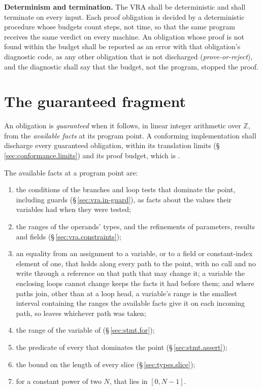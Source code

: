 \begin{constraint}
  \textbf{Determinism and termination.}
  The VRA shall be deterministic and shall terminate on every input.  Each proof
  obligation is decided by a deterministic procedure whose budgets count steps,
  not time, so that the same program receives the same verdict on every
  machine.  An obligation whose proof is not found within the budget shall be
  reported as an error with that obligation's diagnostic code, as any other
  obligation that is not discharged (\emph{prove-or-reject}), and the diagnostic
  shall say that the budget, not the program, stopped the proof.
\end{constraint}

\section{The guaranteed fragment}
\label{sec:vra.fragment}

\pnum
An obligation is \emph{guaranteed} when it follows, in linear integer arithmetic
over $\mathbb{Z}$, from the \emph{available facts} at its program point.  A
conforming implementation shall discharge every guaranteed obligation, within
its translation limits (\S\,\ref{sec:conformance.limits}) and its proof budget,
which is .

\pnum
The available facts at a program point are:
\begin{enumerate}
  \item the conditions of the branches and loop tests that dominate the point,
        including  guards (\S\,\ref{sec:vra.in-guard}), as facts about
        the values their variables had when they were tested;
  \item the ranges of the operands' types, and the refinements of parameters,
        results and fields (\S\,\ref{sec:vra.constraints});
  \item an equality from an assignment to a variable, or to a field or
        constant-index element of one, that holds along every path to the
        point, with no call and no write through a reference on that path
        that may change it; a variable the enclosing loops cannot change keeps
        the facts it had before them; and where paths join, other than at a
        loop head, a variable's range is the smallest interval containing the
        ranges the available facts give it on each incoming path, so
         leaves  whichever path was
        taken;
  \item the range of the variable of 
        (\S\,\ref{sec:stmt.for});
  \item the predicate of every  that dominates the point
        (\S\,\ref{sec:stmt.assert});
  \item the bound on the length of every slice (\S\,\ref{sec:types.slice});
  \item for a constant power of two $N$, that  lies in
        $[0, N - 1]$.
\end{enumerate}

